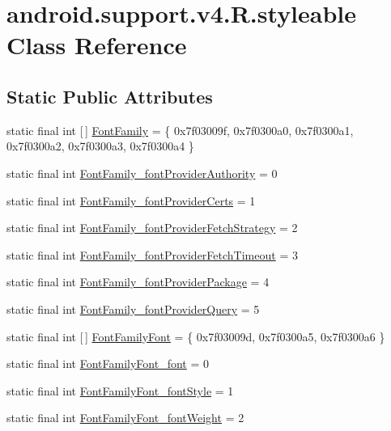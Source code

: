 \hypertarget{classandroid_1_1support_1_1v4_1_1R_1_1styleable}{}\section{android.\+support.\+v4.\+R.\+styleable Class Reference}
\label{classandroid_1_1support_1_1v4_1_1R_1_1styleable}
\subsection*{Static Public Attributes}
\begin{DoxyCompactItemize}
\item 
static final int \mbox{[}$\,$\mbox{]} \mbox{\hyperlink{classandroid_1_1support_1_1v4_1_1R_1_1styleable_af02bcd0e579c3c0485ea2152fa989b5d}{Font\+Family}} = \{ 0x7f03009f, 0x7f0300a0, 0x7f0300a1, 0x7f0300a2, 0x7f0300a3, 0x7f0300a4 \}
\item 
static final int \mbox{\hyperlink{classandroid_1_1support_1_1v4_1_1R_1_1styleable_aeedebf1666278ead2704c0bf2fce4d7b}{Font\+Family\+\_\+font\+Provider\+Authority}} = 0
\item 
static final int \mbox{\hyperlink{classandroid_1_1support_1_1v4_1_1R_1_1styleable_ad5cd9e15ddad85f0288dd3d561ac2a1b}{Font\+Family\+\_\+font\+Provider\+Certs}} = 1
\item 
static final int \mbox{\hyperlink{classandroid_1_1support_1_1v4_1_1R_1_1styleable_ad814b256f41f19d04fadaa7df601936f}{Font\+Family\+\_\+font\+Provider\+Fetch\+Strategy}} = 2
\item 
static final int \mbox{\hyperlink{classandroid_1_1support_1_1v4_1_1R_1_1styleable_aaaf535dfb52220251ff8633caf796a8a}{Font\+Family\+\_\+font\+Provider\+Fetch\+Timeout}} = 3
\item 
static final int \mbox{\hyperlink{classandroid_1_1support_1_1v4_1_1R_1_1styleable_a76bbd69018668d0a9275df9d2ba1cfc3}{Font\+Family\+\_\+font\+Provider\+Package}} = 4
\item 
static final int \mbox{\hyperlink{classandroid_1_1support_1_1v4_1_1R_1_1styleable_a9f05264664b8cbeb9f788a7a17677d65}{Font\+Family\+\_\+font\+Provider\+Query}} = 5
\item 
static final int \mbox{[}$\,$\mbox{]} \mbox{\hyperlink{classandroid_1_1support_1_1v4_1_1R_1_1styleable_ac5ee5bd5b900b1eb6b0bcccb719bfa0f}{Font\+Family\+Font}} = \{ 0x7f03009d, 0x7f0300a5, 0x7f0300a6 \}
\item 
static final int \mbox{\hyperlink{classandroid_1_1support_1_1v4_1_1R_1_1styleable_a34399eff955f22f34653274751e96569}{Font\+Family\+Font\+\_\+font}} = 0
\item 
static final int \mbox{\hyperlink{classandroid_1_1support_1_1v4_1_1R_1_1styleable_a629caf7a9a9f179867eeafb5b9b37cbc}{Font\+Family\+Font\+\_\+font\+Style}} = 1
\item 
static final int \mbox{\hyperlink{classandroid_1_1support_1_1v4_1_1R_1_1styleable_a9d48063e49f6fb0af52e9087c4b62b42}{Font\+Family\+Font\+\_\+font\+Weight}} = 2
\end{DoxyCompactItemize}



